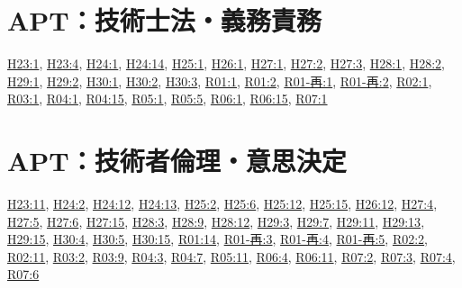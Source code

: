 \section{APT：技術士法・義務責務}
\hyperref[q:h23-reg-apt-01]{H23:1}, \hyperref[q:h23-reg-apt-04]{H23:4}, \hyperref[q:h24-reg-apt-01]{H24:1}, \hyperref[q:h24-reg-apt-14]{H24:14}, \hyperref[q:h25-reg-apt-01]{H25:1}, \hyperref[q:h26-reg-apt-01]{H26:1}, \hyperref[q:h27-reg-apt-01]{H27:1}, \hyperref[q:h27-reg-apt-02]{H27:2}, \hyperref[q:h27-reg-apt-03]{H27:3}, \hyperref[q:h28-reg-apt-01]{H28:1}, \hyperref[q:h28-reg-apt-02]{H28:2}, \hyperref[q:h29-reg-apt-01]{H29:1}, \hyperref[q:h29-reg-apt-02]{H29:2}, \hyperref[q:h30-reg-apt-01]{H30:1}, \hyperref[q:h30-reg-apt-02]{H30:2}, \hyperref[q:h30-reg-apt-03]{H30:3}, \hyperref[q:r01-reg-apt-01]{R01:1}, \hyperref[q:r01-reg-apt-02]{R01:2}, \hyperref[q:r01-ret-apt-01]{R01-再:1}, \hyperref[q:r01-ret-apt-02]{R01-再:2}, \hyperref[q:r02-reg-apt-01]{R02:1}, \hyperref[q:r03-reg-apt-01]{R03:1}, \hyperref[q:r04-reg-apt-01]{R04:1}, \hyperref[q:r04-reg-apt-15]{R04:15}, \hyperref[q:r05-reg-apt-01]{R05:1}, \hyperref[q:r05-reg-apt-05]{R05:5}, \hyperref[q:r06-reg-apt-01]{R06:1}, \hyperref[q:r06-reg-apt-15]{R06:15}, \hyperref[q:r07-reg-apt-01]{R07:1}
\section{APT：技術者倫理・意思決定}
\hyperref[q:h23-reg-apt-11]{H23:11}, \hyperref[q:h24-reg-apt-02]{H24:2}, \hyperref[q:h24-reg-apt-12]{H24:12}, \hyperref[q:h24-reg-apt-13]{H24:13}, \hyperref[q:h25-reg-apt-02]{H25:2}, \hyperref[q:h25-reg-apt-06]{H25:6}, \hyperref[q:h25-reg-apt-12]{H25:12}, \hyperref[q:h25-reg-apt-15]{H25:15}, \hyperref[q:h26-reg-apt-12]{H26:12}, \hyperref[q:h27-reg-apt-04]{H27:4}, \hyperref[q:h27-reg-apt-05]{H27:5}, \hyperref[q:h27-reg-apt-06]{H27:6}, \hyperref[q:h27-reg-apt-15]{H27:15}, \hyperref[q:h28-reg-apt-03]{H28:3}, \hyperref[q:h28-reg-apt-09]{H28:9}, \hyperref[q:h28-reg-apt-12]{H28:12}, \hyperref[q:h29-reg-apt-03]{H29:3}, \hyperref[q:h29-reg-apt-07]{H29:7}, \hyperref[q:h29-reg-apt-11]{H29:11}, \hyperref[q:h29-reg-apt-13]{H29:13}, \hyperref[q:h29-reg-apt-15]{H29:15}, \hyperref[q:h30-reg-apt-04]{H30:4}, \hyperref[q:h30-reg-apt-05]{H30:5}, \hyperref[q:h30-reg-apt-15]{H30:15}, \hyperref[q:r01-reg-apt-14]{R01:14}, \hyperref[q:r01-ret-apt-03]{R01-再:3}, \hyperref[q:r01-ret-apt-04]{R01-再:4}, \hyperref[q:r01-ret-apt-05]{R01-再:5}, \hyperref[q:r02-reg-apt-02]{R02:2}, \hyperref[q:r02-reg-apt-11]{R02:11}, \hyperref[q:r03-reg-apt-02]{R03:2}, \hyperref[q:r03-reg-apt-09]{R03:9}, \hyperref[q:r04-reg-apt-03]{R04:3}, \hyperref[q:r04-reg-apt-07]{R04:7}, \hyperref[q:r05-reg-apt-11]{R05:11}, \hyperref[q:r06-reg-apt-04]{R06:4}, \hyperref[q:r06-reg-apt-11]{R06:11}, \hyperref[q:r07-reg-apt-02]{R07:2}, \hyperref[q:r07-reg-apt-03]{R07:3}, \hyperref[q:r07-reg-apt-04]{R07:4}, \hyperref[q:r07-reg-apt-06]{R07:6}

